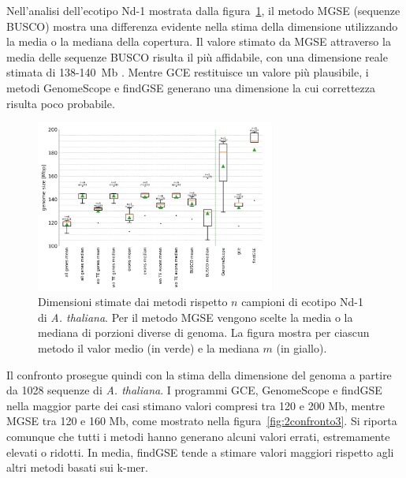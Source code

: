 \documentclass[crop=false, class=book]{standalone}
\begin{document}
	Nell'analisi dell'ecotipo Nd-1 mostrata dalla figura~\ref{fig:2confronto1b}, il metodo MGSE (sequenze BUSCO) mostra una differenza evidente nella stima della dimensione utilizzando la media o la mediana della copertura. Il valore stimato da MGSE attraverso la media delle sequenze BUSCO risulta il più affidabile, con una dimensione reale stimata di 138-140~Mb \cite{pucker2016denovo}. Mentre GCE restituisce un valore più plausibile, i metodi GenomeScope e findGSE generano una dimensione la cui correttezza risulta poco probabile.

	\begin{figure}[]
		\centering
		\includegraphics[width=0.7\textwidth]{capitoli/analisi/confronto/confronto2/1b.png}
		\caption{Dimensioni stimate dai metodi rispetto $n$ campioni di ecotipo Nd-1 di \textit{A. thaliana}. Per il metodo MGSE vengono scelte la media o la mediana di porzioni diverse di genoma. La figura mostra per ciascun metodo il valor medio (in verde) e la mediana $m$ (in giallo).}
		\label{fig:2confronto1b}
	\end{figure}
	
	Il confronto prosegue quindi con la stima della dimensione del genoma a partire da 1028 sequenze di \textit{A. thaliana}. I programmi GCE, GenomeScope e findGSE nella maggior parte dei casi stimano valori compresi tra 120 e 200 Mb, mentre MGSE tra 120 e 160 Mb, come mostrato nella figura~\vref{fig:2confronto3}. Si riporta comunque che tutti i metodi hanno generano alcuni valori errati, estremamente elevati o ridotti. In media, findGSE tende a stimare valori maggiori rispetto agli altri metodi basati sui k-mer.
	
\end{document}
